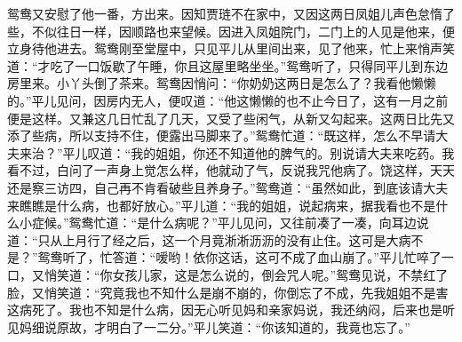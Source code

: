 \begin{parag}


    鸳鸯又安慰了他一番，方出来。因知贾琏不在家中，又因这两日凤姐儿声色怠惰了些，不似往日一样，因顺路也来望候。因进入凤姐院门，二门上的人见是他来，便立身待他进去。鸳鸯刚至堂屋中，只见平儿从里间出来，见了他来，忙上来悄声笑道：“才吃了一口饭歇了午睡，你且这屋里略坐坐。”鸳鸯听了，只得同平儿到东边房里来。小丫头倒了茶来。鸳鸯因悄问：“你奶奶这两日是怎么了？我看他懒懒的。”平儿见问，因房内无人，便叹道：“他这懒懒的也不止今日了，这有一月之前便是这样。又兼这几日忙乱了几天，又受了些闲气，从新又勾起来。这两日比先又添了些病，所以支持不住，便露出马脚来了。”鸳鸯忙道：“既这样，怎么不早请大夫来治？”平儿叹道：“我的姐姐，你还不知道他的脾气的。别说请大夫来吃药。我看不过，白问了一声身上觉怎么样，他就动了气，反说我咒他病了。饶这样，天天还是察三访四，自己再不肯看破些且养身子。”鸳鸯道：“虽然如此，到底该请大夫来瞧瞧是什么病，也都好放心。”平儿道：“我的姐姐，说起病来，据我看也不是什么小症候。”鸳鸯忙道：“是什么病呢？”平儿见问，又往前凑了一凑，向耳边说道：“只从上月行了经之后，这一个月竟淅淅沥沥的没有止住。这可是大病不是？”鸳鸯听了，忙答道：“嗳哟！依你这话，这可不成了血山崩了。”平儿忙啐了一口，又悄笑道：“你女孩儿家，这是怎么说的，倒会咒人呢。”鸳鸯见说，不禁红了脸，又悄笑道：“究竟我也不知什么是崩不崩的，你倒忘了不成，先我姐姐不是害这病死了。我也不知是什么病，因无心听见妈和亲家妈说，我还纳闷，后来也是听见妈细说原故，才明白了一二分。”平儿笑道：“你该知道的，我竟也忘了。”
\end{parag}


